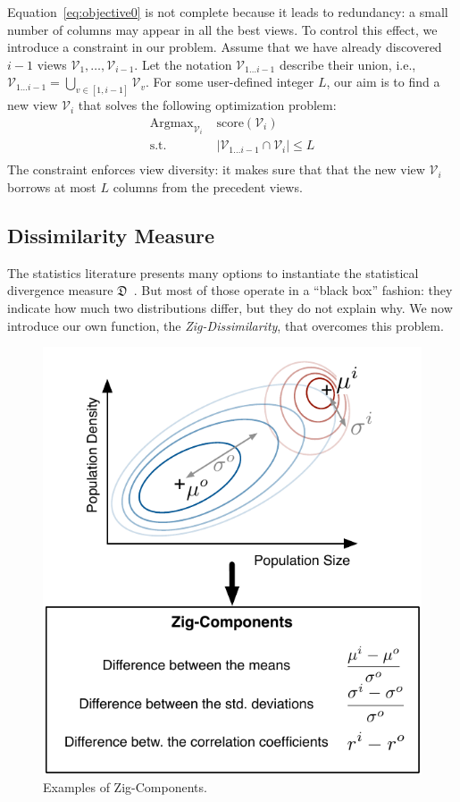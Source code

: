 Equation~\ref{eq:objective0} is not complete because it leads to
redundancy: a small number of columns may appear in all the best views. To
control this effect, we introduce a constraint in our problem.  Assume
that we have already discovered $i-1$ views $\mathcal{V}_1, \ldots,
\mathcal{V}_{i-1}$. Let the notation $\mathcal{V}_{1 \ldots i-1}$ describe
their union, i.e., $\mathcal{V}_{1 \ldots i-1} = \bigcup_{v \in [1,i-1]}
\mathcal{V}_v$. For some user-defined integer $L$, our aim is to find a new
view $\mathcal{V}_i$ that solves the following optimization problem:
\begin{equation}
    \label{eq:objective}
    \begin{aligned}
        \text{Argmax}_{\mathcal{V}_i}\; 
        & \text{score} (\mathcal{V}_i)\\
         \text{s.t.} 
         & \left|\mathcal{V}_{1\ldots i-1} \cap  \mathcal{V}_i  \right| \leq L\\ 
    \end{aligned}
\end{equation}
The constraint enforces view diversity: it makes sure that that the new view
$\mathcal{V}_i$ borrows at most $L$ columns from the precedent views.
\pagebreak

\subsection{Dissimilarity Measure}
The statistics literature presents many options to instantiate the statistical 
divergence measure $\mathfrak{D}$~\cite{wasserman2013all}. But most of those
operate in a ``black box'' fashion: they indicate how much two distributions
differ, but they do not explain why. We now introduce our own function, the
\emph{Zig-Dissimilarity}, that overcomes this problem.

\begin{figure}[t!]
    \centering
    \includegraphics[width=.85\columnwidth]{Images/Zig-Dissimilarity}
    \caption{Examples of Zig-Components.}
    \label{fig:zig-dissim}
\end{figure}

